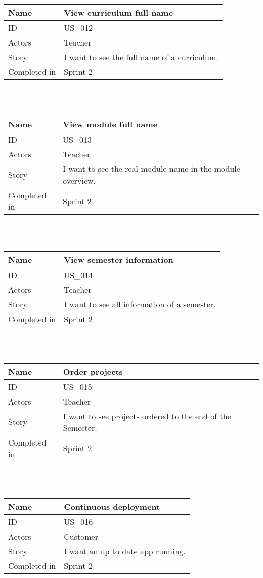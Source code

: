 \documentclass[12pt, a4paper]{article}
\newcommand\addrow[2]{#1 &#2\\ }
\newcommand\tabularhead{\begin{tabular}{lp{8cm}}
		\hline
	}
\newenvironment{usecase}{\tabularhead}
	{\hline\end{tabular}}
\begin{document}
 ~\\
 ~\\
 
 	    \begin{usecase}
 	\addrow{Name}{View curriculum full name}
 	\hline
 	\addrow{ID}{US\_012}
 	\hline
 	\addrow{Actors}{ Teacher }
 	\hline		
 	\addrow{Story}{I want to see the full name of a curriculum.}
 	\hline
 	\addrow{Completed in}{Sprint 2}
 \end{usecase}
 
 ~\\
 ~\\
 
 \begin{usecase}
 	\addrow{Name}{View module full name}
 	\hline
 	\addrow{ID}{US\_013}
 	\hline
 	\addrow{Actors}{ Teacher }
 	\hline		
 	\addrow{Story}{I want to see the real module name in the module overview.}
 	\hline
 	\addrow{Completed in}{Sprint 2}
 \end{usecase}
 
 ~\\
 ~\\
 
 
 \begin{usecase}
 	\addrow{Name}{View semester information}
 	\hline
 	\addrow{ID}{US\_014}
 	\hline
 	\addrow{Actors}{ Teacher }
 	\hline		
 	\addrow{Story}{I want to see all information of a semester.}
 	\hline
 	\addrow{Completed in}{Sprint 2}
 \end{usecase}
 
 ~\\
 ~\\
 
 \begin{usecase}
 	\addrow{Name}{Order projects}
 	\hline
 	\addrow{ID}{US\_015}
 	\hline
 	\addrow{Actors}{ Teacher }
 	\hline		
 	\addrow{Story}{I want to see projects ordered to the end of the Semester.}
 	\hline
 	\addrow{Completed in}{Sprint 2}
 \end{usecase}
 
 ~\\
 ~\\
 
 \begin{usecase}
 	\addrow{Name}{Continuous deployment}
 	\hline
 	\addrow{ID}{US\_016}
 	\hline
 	\addrow{Actors}{ Customer }
 	\hline		
 	\addrow{Story}{I want an up to date app running.}
 	\hline
 	\addrow{Completed in}{Sprint 2}
 \end{usecase}
 
 ~\\
 ~\\
 
\end{document}
